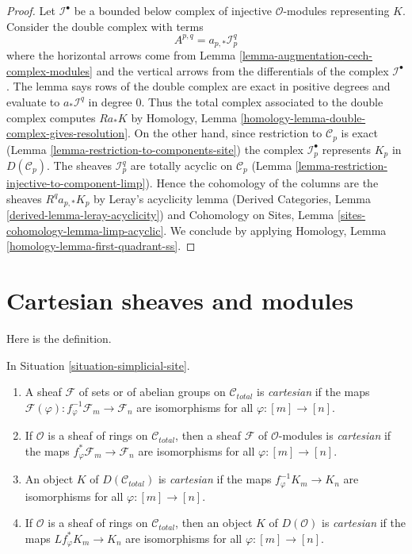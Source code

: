 \begin{proof}
Let $\mathcal{I}^\bullet$ be a bounded below complex of injective
$\mathcal{O}$-modules representing $K$. Consider the double complex with terms
$$
A^{p, q} = a_{p, *}\mathcal{I}^q_p
$$
where the horizontal arrows come from
Lemma \ref{lemma-augmentation-cech-complex-modules}
and the vertical arrows from the differentials of the
complex $\mathcal{I}^\bullet$. The lemma
says rows of the double complex are exact
in positive degrees and evaluate to
$a_*\mathcal{I}^q$ in degree $0$.
Thus the total complex associated to the double complex
computes $Ra_*K$ by
Homology, Lemma \ref{homology-lemma-double-complex-gives-resolution}.
On the other hand, since restriction to $\mathcal{C}_p$ is exact
(Lemma \ref{lemma-restriction-to-components-site})
the complex $\mathcal{I}_p^\bullet$ represents $K_p$ in
$D(\mathcal{C}_p)$. The sheaves $\mathcal{I}_p^q$
are totally acyclic on $\mathcal{C}_p$
(Lemma \ref{lemma-restriction-injective-to-component-limp}).
Hence the cohomology of the columns are the sheaves
$R^qa_{p, *}K_p$ by Leray's acyclicity lemma
(Derived Categories, Lemma \ref{derived-lemma-leray-acyclicity})
and
Cohomology on Sites, Lemma \ref{sites-cohomology-lemma-limp-acyclic}.
We conclude by applying
Homology, Lemma \ref{homology-lemma-first-quadrant-ss}.
\end{proof}





\section{Cartesian sheaves and modules}
\label{section-cartesian}

\noindent
Here is the definition.

\begin{definition}
\label{definition-cartesian-sheaf}
In Situation \ref{situation-simplicial-site}.
\begin{enumerate}
\item A sheaf $\mathcal{F}$ of sets or of abelian groups on
$\mathcal{C}_{total}$ is {\it cartesian} if the maps
$\mathcal{F}(\varphi) : f_\varphi^{-1}\mathcal{F}_m \to \mathcal{F}_n$
are isomorphisms for all $\varphi : [m] \to [n]$.
\item If $\mathcal{O}$ is a sheaf of rings on $\mathcal{C}_{total}$,
then a sheaf $\mathcal{F}$ of $\mathcal{O}$-modules is
{\it cartesian} if  the maps $f_\varphi^*\mathcal{F}_m \to \mathcal{F}_n$
are isomorphisms for all $\varphi : [m] \to [n]$.
\item An object $K$ of $D(\mathcal{C}_{total})$ is {\it cartesian} if the maps
$f_\varphi^{-1}K_m \to K_n$
are isomorphisms for all $\varphi : [m] \to [n]$.
\item If $\mathcal{O}$ is a sheaf of rings on $\mathcal{C}_{total}$, then
an object $K$ of $D(\mathcal{O})$ is {\it cartesian} if the maps
$Lf_\varphi^*K_m \to K_n$
are isomorphisms for all $\varphi : [m] \to [n]$.
\end{enumerate}
\end{definition}

